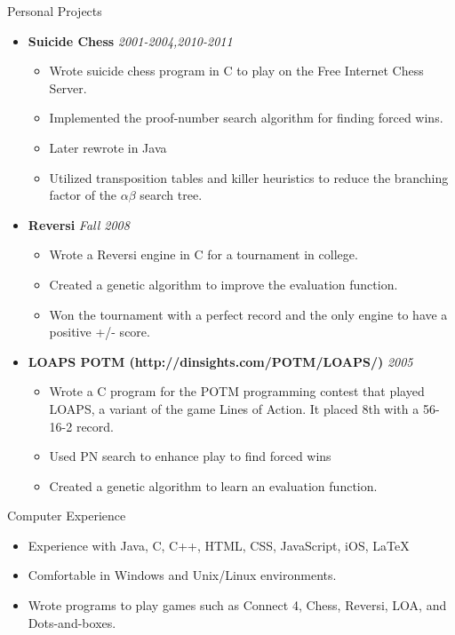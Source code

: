 \documentclass[11pt,oneside]{article}
\newenvironment{ressection}[1]{
	\vspace{4pt}
	{\fontfamily{phv}\selectfont\Large#1}
	\begin{itemize}
	\vspace{3pt}
}{
	\end{itemize}
}
\newcommand{\resitem}[1]{
	\vspace{-4pt}
	\item \begin{flushleft} #1 \end{flushleft}
}
\newcommand{\ressubitem}[1]{
	\vspace{-1pt}
	\item \begin{flushleft} #1 \end{flushleft}
}
\newcommand{\resbigitemb}[2]{
	\vspace{-5pt}
	\item{\textbf{#1} \hfill \textit{#2}}
}
\newenvironment{resdateditem}[2]{
	\resbigitemb{#1}{#2}
	\vspace{-2pt}
	\begin{itemize}
}{
	\end{itemize}
}
\begin{document}
\begin{ressection}{Personal Projects}
  \begin{resdateditem}{Suicide Chess}{2001-2004,2010-2011}
    \ressubitem{Wrote suicide chess program in C to play on the Free Internet Chess Server.}
    \ressubitem{Implemented the proof-number search algorithm for finding forced wins.}
    \ressubitem{Later rewrote in Java}
    \ressubitem{Utilized transposition tables and killer heuristics to reduce the branching factor of the $\alpha\beta$ search tree.}
  \end{resdateditem}

  \begin{resdateditem}{Reversi}{Fall 2008}
    \ressubitem{Wrote a Reversi engine in C for a tournament in college.}
		\ressubitem{Created a genetic algorithm to improve the evaluation function.}
		\ressubitem{Won the tournament with a perfect record and the only engine to have a positive +/- score.}
  \end{resdateditem}
	

  \begin{resdateditem}{LOAPS POTM (http://dinsights.com/POTM/LOAPS/)}{2005}
    \ressubitem{Wrote a C program for the POTM programming contest that
    played LOAPS, a variant of the game Lines of Action.  It placed 8th
    with a 56-16-2 record.}
    \ressubitem{Used PN search to enhance play to find forced wins}
    \ressubitem{Created a genetic algorithm to learn an evaluation function.}
  \end{resdateditem}

\end{ressection}

\begin{ressection}{Computer Experience}
  \resitem{Experience with Java, C, C++, HTML, CSS, JavaScript, iOS, \LaTeX}
  \resitem{Comfortable in Windows and Unix/Linux environments.}
  \resitem{Wrote programs to play games such as Connect 4, Chess, Reversi, LOA, and Dots-and-boxes.}
\end{ressection}
\end{document}
